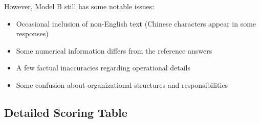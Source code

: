 However, Model B still has some notable issues:
\begin{itemize}
    \item Occasional inclusion of non-English text (Chinese characters appear in some responses)
    \item Some numerical information differs from the reference answers
    \item A few factual inaccuracies regarding operational details
    \item Some confusion about organizational structures and responsibilities
\end{itemize}


\subsection{Detailed Scoring Table}

